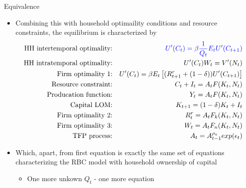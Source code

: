 \documentclass[9pt,xcolor={dvipsnames}]{beamer}
\newcommand{\bit}{\begin{itemize}}
\newcommand{\eit}{\end{itemize}}
\newcommand{\bc}{\color{blue}}
\begin{document}
\begin{frame}{Equivalence}

\bit
\setlength\itemsep{1.5em} 


\item Combining this with household optimaility conditions and resource constraints, the equilibrium is characterized by
\begin{eqnarray}
\text{HH intertemporal optimality:} && {\bc U'(C_t) = \beta\frac{1}{Q_t} E_t U'(C_{t+1})} \nonumber \\
\text{HH intratemporal optimality:} && U'(C_t)W_t = V'(N_t) \nonumber \\
\text{Firm optimality 1:} && U'(C_t) = \beta E_t\left[(R^{r}_{t+1}+(1-\delta)) U'(C_{t+1})\right] \nonumber \\
\text{Resource constraint:} && C_t + I_t = A_t F(K_t, N_t) \nonumber \\
\text{Producation function:} && Y_t = A_t F(K_t, N_t) \nonumber \\
\text{Capital LOM:} && K_{t+1} = (1-\delta) K_t + I_t \nonumber \\
\text{Firm optimality 2:} && R^{r}_t = A_t F_k (K_t, N_t) \nonumber \\
\text{Firm optimality 3:} && W_t = A_t F_n (K_t, N_t) \nonumber \\
\text{TFP process:} && A_t = A_{t-1}^{\rho_a}exp(\epsilon_t) \nonumber
\end{eqnarray}

\item Which, apart, from first equation is exactly the same set of equations characterizing the RBC model with household ownership of capital
\bit
	\item One more unkown $Q_t$ - one more equation
\eit

\eit

\end{frame}
\end{document}
